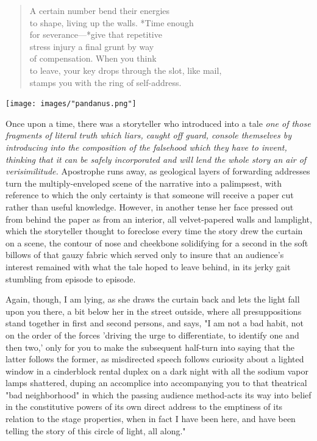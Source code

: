 \documentclass[
]{memoir}
\newlength{\drop}%
\begin{document}
\begin{verse}
A certain number bend their energies\\
to shape, living up the walls. *Time enough\\
for severance—*give that repetitive\\
stress injury a final grunt by way\\
of compensation. When you think\\
to leave, your key drops through the slot, like mail,\\
stamps you with the ring of self-address.\\
\end{verse}

\begin{center}\texttt{[image: images/"pandanus.png"]}\end{center}

Once upon a time, there was a storyteller who introduced into a tale
\emph{one of those fragments of literal truth which liars, caught off
guard, console themselves by introducing into the composition of the
falsehood which they have to invent, thinking that it can be safely
incorporated and will lend the whole story an air of verisimilitude.}
Apostrophe runs away, as geological layers of forwarding addresses turn
the multiply-enveloped scene of the narrative into a palimpsest, with
reference to which the only certainty is that someone will receive a
paper cut rather than useful knowledge. However, in another tense her
face pressed out from behind the paper as from an interior, all
velvet-papered walls and lamplight, which the storyteller thought to
foreclose every time the story drew the curtain on a scene, the contour
of nose and cheekbone solidifying for a second in the soft billows of
that gauzy fabric which served only to insure that an audience's
interest remained with what the tale hoped to leave behind, in its jerky
gait stumbling from episode to episode.

Again, though, I am lying, as she draws the curtain back and lets the
light fall upon you there, a bit below her in the street outside, where
all presuppositions stand together in first and second persons, and
says, "I am not a bad habit, not on the order of the forces 'driving the
urge to differentiate, to identify one and then two,' only for you to
make the subsequent half-turn into saying that the latter follows the
former, as misdirected speech follows curiosity about a lighted window
in a cinderblock rental duplex on a dark night with all the sodium vapor
lamps shattered, duping an accomplice into accompanying you to that
theatrical "bad neighborhood" in which the passing audience method-acts
its way into belief in the constitutive powers of its own direct address
to the emptiness of its relation to the stage properties, when in fact I
have been here, and have been telling the story of this circle of light,
all along."
\end{document}
